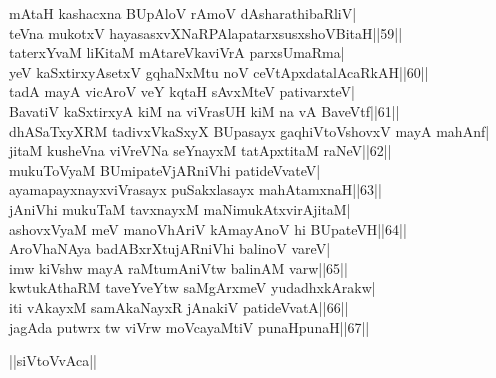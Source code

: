 \documentclass{article}
\begin{document}
mAtaH kashacxna BUpAloV rAmoV dAsharathibaRliV|\\
teVna mukotxV hayasasxvXNaRPAlapatarxsusxshoVBitaH||59||\\
taterxYvaM liKitaM mAtareVkaviVrA parxsUmaRma|\\
yeV kaSxtirxyAsetxV gqhaNxMtu noV ceVtApxdatalAcaRkAH||60||\\
tadA mayA vicAroV veY kqtaH sAvxMteV pativarxteV|\\
BavatiV kaSxtirxyA kiM na viVrasUH kiM na vA BaveVtf||61||\\
dhASaTxyXRM tadivxVkaSxyX BUpasayx gaqhiVtoVshovxV mayA mahAnf|\\
jitaM kusheVna viVreVNa seYnayxM tatApxtitaM raNeV||62||\\
mukuToVyaM BUmipateVjARniVhi patideVvateV|\\
ayamapayxnayxviVrasayx puSakxlasayx mahAtamxnaH||63||\\
jAniVhi mukuTaM tavxnayxM maNimukAtxvirAjitaM|\\
ashovxVyaM meV manoVhAriV kAmayAnoV hi BUpateVH||64||\\
AroVhaNAya badABxrXtujARniVhi balinoV vareV|\\
imw kiVshw mayA raMtumAniVtw balinAM varw||65||\\
kwtukAthaRM taveYveYtw saMgArxmeV yudadhxkArakw|\\
iti vAkayxM samAkaNayxR jAnakiV patideVvatA||66||\\
jagAda putwrx tw viVrw moVcayaMtiV punaHpunaH||67||\\

\begin{center}
||siVtoVvAca||
\end{center}
\end{document}

